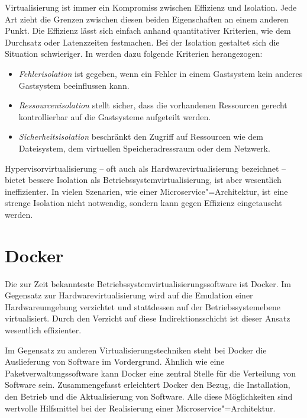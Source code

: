 Virtualisierung ist immer ein Kompromiss zwischen Effizienz und Isolation. Jede Art zieht die Grenzen zwischen diesen beiden Eigenschaften an einem anderen Punkt. Die Effizienz lässt sich einfach anhand quantitativer Kriterien, wie dem Durchsatz oder Latenzzeiten festmachen. Bei der Isolation gestaltet sich die Situation schwieriger. In \cite{Soltesz:2007:COS:1272996.1273025} werden dazu folgende Kriterien herangezogen:

\begin{itemize}
	\item \textit{Fehlerisolation} ist gegeben, wenn ein Fehler in einem Gastsystem kein anderes Gastsystem beeinflussen kann.
	\item \textit{Ressourcenisolation} stellt sicher, dass die vorhandenen Ressourcen gerecht \bzw kontrollierbar auf die Gastsysteme aufgeteilt werden.
	\item \textit{Sicherheitsisolation} beschränkt den Zugriff auf Ressourcen wie dem Dateisystem, dem virtuellen Speicheradressraum oder dem Netzwerk.
\end{itemize}

Hypervisorvirtualisierung -- oft auch als Hardwarevirtualisierung bezeichnet -- bietet bessere Isolation als Betriebssystemvirtualisierung, ist aber wesentlich ineffizienter. In vielen Szenarien, wie einer Microservice"=Architektur, ist eine strenge Isolation nicht notwendig, sondern kann gegen Effizienz eingetauscht werden.

\section{Docker}

Die zur Zeit bekannteste Betriebssystemvirtualisierungssoftware ist Docker. Im Gegensatz zur Hardwarevirtualisierung wird auf die Emulation einer Hardwareumgebung verzichtet und stattdessen auf der Betriebssystemebene virtualisiert. Durch den Verzicht auf diese Indirektionsschicht ist dieser Ansatz wesentlich effizienter.

Im Gegensatz zu anderen Virtualisierungstechniken steht bei \mbox{Docker} die Auslieferung von Software im Vordergrund. Ähnlich wie eine Paketverwaltungssoftware kann Docker eine zentral Stelle für die Verteilung von Software sein. Zusammengefasst erleichtert Docker den Bezug, die Installation, den Betrieb und die Aktualisierung von Software. Alle diese Möglichkeiten sind wertvolle Hilfsmittel bei der Realisierung einer Microservice"=Architektur.

